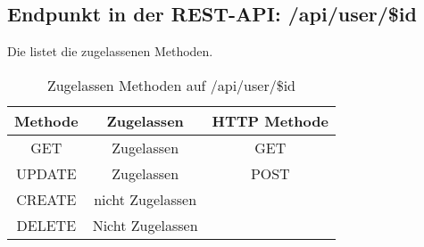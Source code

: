 \subsection{Endpunkt in der REST-API: /api/user/\$id}
Die  listet die zugelassenen Methoden. 

\begin{table}[!htbp]
	\begin{tabular}{|c|c|c|}
		\hline
			\textbf{Methode} & \textbf{Zugelassen} & \textbf{HTTP Methode} \\ \hline
			GET & Zugelassen & GET \\ \hline
			UPDATE & Zugelassen & POST \\ \hline 
			CREATE & nicht Zugelassen & \\ \hline  
			DELETE & Nicht Zugelassen & \\ \hline
	\end{tabular}

		\caption{Zugelassen Methoden auf /api/user/\$id}
		\label{tab:end:rest:api:user:id:meth}
\end{table}